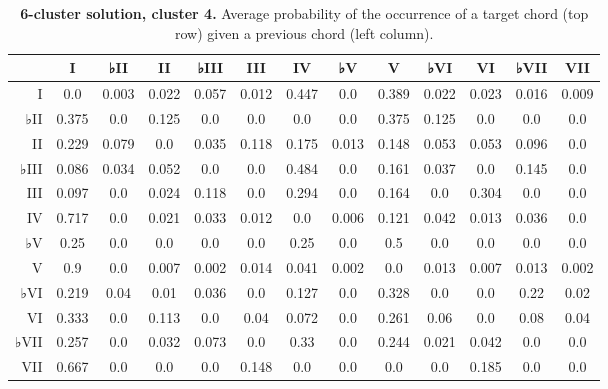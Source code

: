 \begin{table}[htbp]
\begin{minipage}{\linewidth}
\setlength{\tymax}{0.5\linewidth}
\centering
\small
\caption{\textbf{6-cluster solution, cluster 4.} Average probability of the occurrence of a target chord (top row) given a previous chord (left column).}
\label{6-clustersolutioncluster4.averageprobabilityoftheoccurrenceofatargetchordtoprowgivenapreviouschordleftcolumn.}
\begin{tabulary}{\textwidth}{@{}RCCCCCCCCCCCC@{}} \toprule
&I&♭II&II&♭III&III&IV&♭V&V&♭VI&VI&♭VII&VII\\
\midrule
I&0.0&0.003&0.022&0.057&0.012&0.447&0.0&0.389&0.022&0.023&0.016&0.009\\
♭II&0.375&0.0&0.125&0.0&0.0&0.0&0.0&0.375&0.125&0.0&0.0&0.0\\
II&0.229&0.079&0.0&0.035&0.118&0.175&0.013&0.148&0.053&0.053&0.096&0.0\\
♭III&0.086&0.034&0.052&0.0&0.0&0.484&0.0&0.161&0.037&0.0&0.145&0.0\\
III&0.097&0.0&0.024&0.118&0.0&0.294&0.0&0.164&0.0&0.304&0.0&0.0\\
IV&0.717&0.0&0.021&0.033&0.012&0.0&0.006&0.121&0.042&0.013&0.036&0.0\\
♭V&0.25&0.0&0.0&0.0&0.0&0.25&0.0&0.5&0.0&0.0&0.0&0.0\\
V&0.9&0.0&0.007&0.002&0.014&0.041&0.002&0.0&0.013&0.007&0.013&0.002\\
♭VI&0.219&0.04&0.01&0.036&0.0&0.127&0.0&0.328&0.0&0.0&0.22&0.02\\
VI&0.333&0.0&0.113&0.0&0.04&0.072&0.0&0.261&0.06&0.0&0.08&0.04\\
♭VII&0.257&0.0&0.032&0.073&0.0&0.33&0.0&0.244&0.021&0.042&0.0&0.0\\
VII&0.667&0.0&0.0&0.0&0.148&0.0&0.0&0.0&0.0&0.185&0.0&0.0\\

\bottomrule

\end{tabulary}
\end{minipage}
\end{table}

